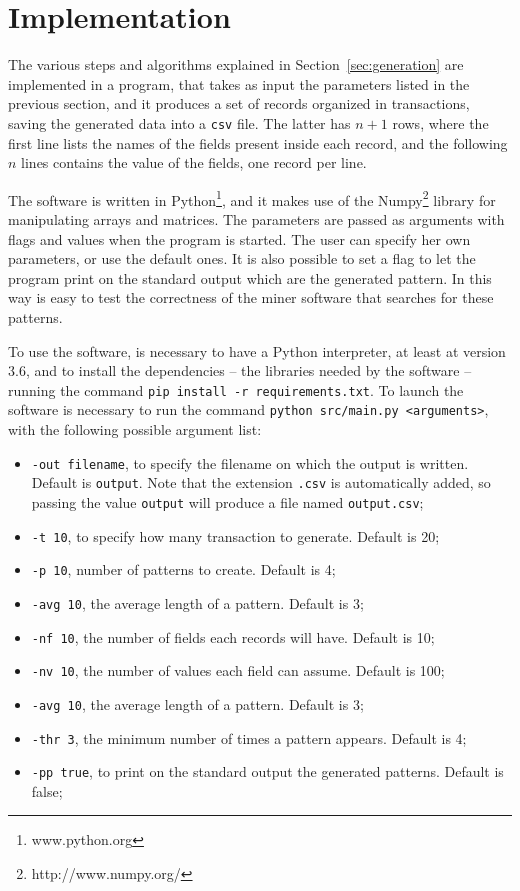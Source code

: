 \documentclass{acm_proc_article-sp-sigmod09}
\begin{document}
\section{Implementation}
The various steps and algorithms explained in Section~\ref{sec:generation} are implemented in a program, that takes as input the parameters listed in the previous section, and it produces a set of records organized in transactions, saving the generated data into a \texttt{csv} file. The latter has $n + 1$ rows, where the first line lists the names of the fields present inside each record, and the following $n$ lines contains the value of the fields, one record per line.

The software is written in Python\footnote{www.python.org}, and it makes use of the Numpy\footnote{http://www.numpy.org/} library \cite{oliphant2006guide} for manipulating arrays and matrices. The parameters are passed as arguments with flags and values when the program is started. The user can specify her own parameters, or use the default ones. It is also possible to set a flag to let the program print on the standard output which are the generated pattern. In this way is easy to test the correctness of the miner software that searches for these patterns.

To use the software, is necessary to have a Python interpreter, at least at version 3.6, and to install the dependencies -- the libraries needed by the software -- running the command \texttt{pip install -r requirements.txt}. To launch the software is necessary to run the command \texttt{python src/main.py <arguments>}, with the following possible argument list:
\begin{itemize}
\item \texttt{-out filename}, to specify the filename on which the output is written. Default is \texttt{output}. Note that the extension \texttt{.csv} is automatically added, so passing the value \texttt{output} will produce a file named \texttt{output.csv};
\item \texttt{-t 10}, to specify how many transaction to generate. Default is 20;
\item \texttt{-p 10}, number of patterns to create. Default is 4;
\item \texttt{-avg 10}, the average length of a pattern. Default is 3;
\item \texttt{-nf 10}, the number of fields each records will have. Default is 10;
\item \texttt{-nv 10}, the number of values each field can assume. Default is 100;
\item \texttt{-avg 10}, the average length of a pattern. Default is 3;
\item \texttt{-thr 3}, the minimum number of times a pattern appears. Default is 4;
\item \texttt{-pp true}, to print on the standard output the generated patterns. Default is false;
\end{itemize}
\end{document}
